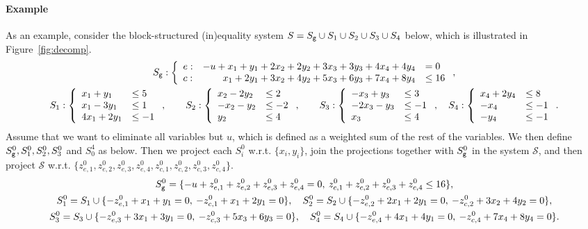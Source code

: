 \paragraph{Example}
As an example, consider the block-structured (in)equality system $S = S_{\texttt{g}} \cup S_1\cup S_2\cup S_3 \cup S_4$ below, which is illustrated in Figure~\ref{fig:decomp}. 
\small{
\begin{gather*}
S_{\texttt{g}}: \left\{ \begin{array}{lrl} e:& -u + x_1 + y_1 + 2 x_2 + 2 y_2 + 3 x_3 + 3 y_3 + 4 x_4 + 4 y_4 &= 0\\
c:& x_1 + 2 y_1 + 3 x_2 + 4 y_2 + 5x_3 + 6 y_3 + 7x_4 + 8 y_4 &\leq 16\end{array}\right.,\\ 
S_1: \left\{ \begin{array}{ll}x_1 + y_1 				&\leq 5\\
															x_1 - 3 y_1 &\leq 1\\
														4 x_1	+ 2 y_1 	&\leq -1\end{array}\right.,\qquad
S_2 : \left\{ \begin{array}{ll}  x_2 - 2 y_2 &\leq 2\\
															 - x_2 - y_2 				&\leq -2\\
																 y_2 							&\leq 4\end{array}\right.,\qquad
S_3 : \left\{ \begin{array}{ll}- x_3 + y_3 			&\leq 3\\
														 - 2 x_3 - y_3 			&\leq -1\\
																 x_3 						&\leq 4\end{array}\right.,\quad
S_4 : \left\{ \begin{array}{ll} x_4 +2 y_4 &\leq 8\\
															- x_4 						&\leq -1\\
															- y_4 						&\leq -1\end{array}\right..
\end{gather*}
}
\normalsize{
Assume that we want to eliminate all variables but $u$, which is defined as a weighted sum of the rest of the variables.
We then define $S_{\texttt{g}}^0, S_1^0, S_2^0, S_3^0$ and $S_0^4$ as below. Then we project each $S_i^0$ w.r.t. $\{x_i, y_i\}$, join the projections together with $S^0_{\texttt{g}}$ in the system $\mathcal{S}$, and then project $\mathcal{S}$ w.r.t. $\{z^0_{e,1}, z^0_{e,2}, z^0_{e,3}, z^0_{e,4}, z^0_{c,1}, z^0_{c,2}, z^0_{c,3}, z^0_{c,4}\}$.}
\small{
\begin{gather*}
S_{\texttt{g}}^0 = \{-u + z_{e,1}^0 + z_{e,2}^0 + z_{e,3}^0 + z_{e,4}^0 = 0, \: 
z_{c,1}^0 + z_{c,2}^0 + z_{c,3}^0 + z_{c,4}^0 \leq 16\},\\
S_1^0 = S_1\cup \{-z_{e,1}^0 + x_1 + y_1 = 0,\: -z_{c,1}^0 + x_1 + 2 y_1 = 0 \},\quad
S_2^0 = S_2\cup \{-z_{e,2}^0 + 2 x_1 + 2 y_1 = 0,\: -z_{c,2}^0 + 3x_2 + 4 y_2 = 0 \},\\
S_3^0 = S_3\cup \{-z_{e,3}^0 + 3 x_1 + 3 y_1 = 0,\: -z_{c,3}^0 + 5 x_3 + 6y_3 = 0 \},\quad
S_4^0 = S_4\cup \{-z_{e,4}^0 + 4 x_1 + 4 y_1 = 0,\: -z_{c,4}^0 + 7 x_4 + 8y_4 = 0 \}.
\end{gather*}
}
